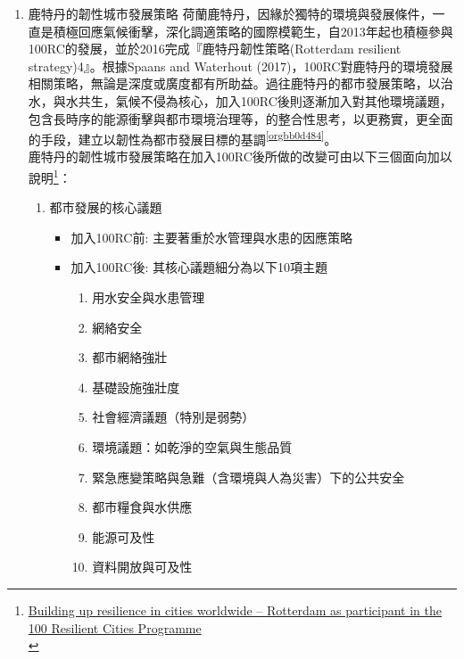 \documentclass[a4paper,12pt]{article}
\begin{document}
\begin{enumerate}
\item 鹿特丹的韌性城市發展策略
\label{sec:org34751a0}
荷蘭鹿特丹，因緣於獨特的環境與發展條件，一直是積極回應氣候衝擊，深化調適策略的國際模範生，自2013年起也積極參與100RC的發展，並於2016完成『鹿特丹韌性策略(Rotterdam resilient strategy)4』。根據Spaans and Waterhout (2017)，100RC對鹿特丹的環境發展相關策略，無論是深度或廣度都有所助益。過往鹿特丹的都市發展策略，以治水，與水共生，氣候不侵為核心，加入100RC後則逐漸加入對其他環境議題，包含長時序的能源衝擊與都市環境治理等，的整合性思考，以更務實，更全面的手段，建立以韌性為都市發展目標的基調\textsuperscript{\ref{orgbb0d484}}。\\

鹿特丹的韌性城市發展策略在加入100RC後所做的改變可由以下三個面向加以說明\footnote{\href{https://www.sciencedirect.com/science/article/abs/pii/S0264275116301159}{Building up resilience in cities worldwide – Rotterdam as participant in the 100 Resilient Cities Programme}\\}：\\
\begin{enumerate}
\item 都市發展的核心議題\\
\begin{itemize}
\item 加入100RC前: 主要著重於水管理與水患的因應策略\\
\item 加入100RC後: 其核心議題細分為以下10項主題\\
\begin{enumerate}
\item 用水安全與水患管理\\
\item 網絡安全\\
\item 都市網絡強壯\\
\item 基礎設施強壯度\\
\item 社會經濟議題（特別是弱勢）\\
\item 環境議題：如乾淨的空氣與生態品質\\
\item 緊急應變策略與急難（含環境與人為災害）下的公共安全\\
\item 都市糧食與水供應\\
\item 能源可及性\\
\item 資料開放與可及性\\

\end{enumerate}
\end{itemize}
\end{enumerate}
\end{enumerate}
\end{document}
